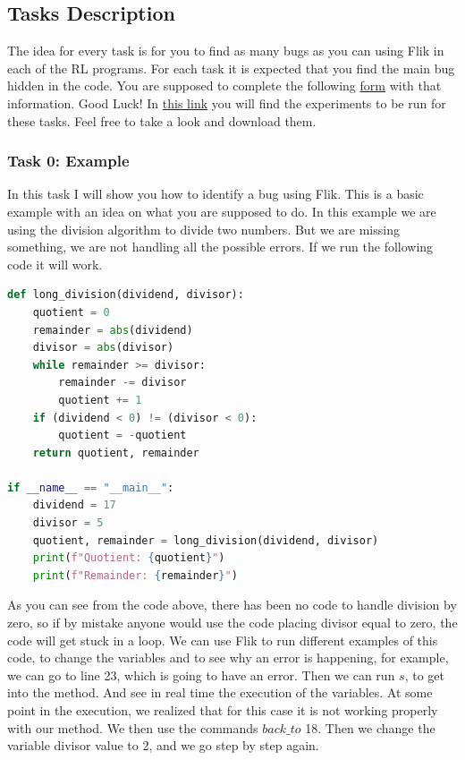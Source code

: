 \subsection{Tasks Description}

The idea for every task is for you to find as many bugs as you can using Flik in each of the RL programs. For each task it is expected that you find the main bug hidden in the code. You are supposed to complete the following \href{https://forms.office.com/r/fg2AnRPfD1}{form} with that information. Good Luck!
In \href{https://github.com/larodriguez22/Flik_Experiments}{this link} you will find the experiments to be run for these tasks. Feel free to take a look and download them.

\subsubsection{Task 0: Example} 
In this task I will show you how to identify a bug using Flik. This is a basic example with an idea on what you are supposed to do. In this example we are using the division algorithm to divide two numbers. But we are missing something, we are not handling all the possible errors. If we run the following code it will work.

\begin{lstlisting}[language=Python]
def long_division(dividend, divisor):
    quotient = 0
    remainder = abs(dividend) 
    divisor = abs(divisor) 
    while remainder >= divisor:
        remainder -= divisor
        quotient += 1
    if (dividend < 0) != (divisor < 0): 
        quotient = -quotient
    return quotient, remainder

if __name__ == "__main__":
    dividend = 17
    divisor = 5
    quotient, remainder = long_division(dividend, divisor)
    print(f"Quotient: {quotient}")
    print(f"Remainder: {remainder}")
\end{lstlisting}

As you can see from the code above, there has been no code to handle division by zero, so if by mistake anyone would use the code placing divisor equal to zero, the code will get stuck in a loop. We can use Flik to run different examples of this code, to change the variables and to see why an error is happening, for example, we can go to line 23, which is going to have an error. Then we can run $s$, to get into the method. And see in real time the execution of the variables. At some point in the execution, we realized that for this case it is not working properly with our method. We then use the commands $back\_to$ 18. Then we change the variable divisor value to 2, and we go step by step again.


